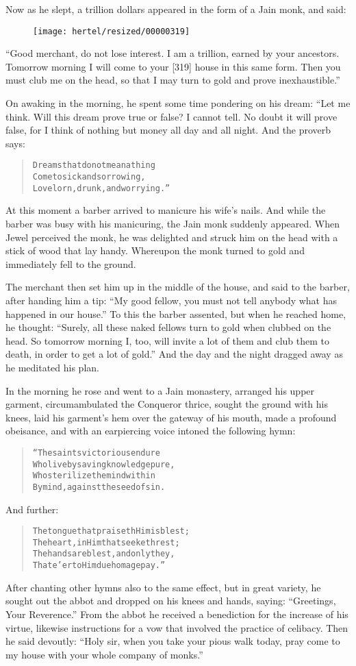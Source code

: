 \documentclass[article, twoside, 10pt]{memoir}
\renewenvironment{verbatim}{%
\begin{quote}%
\vskip -10pt%
\begin{alltt}\normalfont\small}{\end{alltt}%
\end{quote}%
\vskip -10pt
} %
\begin{document}
Now as he slept, a trillion dollars appeared in the form of a Jain
monk, and said:
\begin{figure}[p]\texttt{[image: hertel/resized/00000319]}\end{figure}``Good merchant, do not lose interest. I am a trillion, earned by your ancestors. Tomorrow morning I will come to your [319] house in this same form. Then you must club me on the head, so that I may turn to gold and prove inexhaustible.''

On awaking in the morning, he spent some time pondering on his
dream: “Let me think. Will this dream prove true or false? I cannot
tell. No doubt it will prove false, for I think of nothing but
money all day and all night. And the proverb says:

\begin{verbatim}
Dreams that do not mean a thing
Come to sick and sorrowing,
Lovelorn, drunk, and worrying.”
\end{verbatim}
At this moment a barber arrived to manicure his wife's nails. And
while the barber was busy with his manicuring, the Jain monk
suddenly appeared. When Jewel perceived the monk, he was delighted
and struck him on the head with a stick of wood that lay handy.
Whereupon the monk turned to gold and immediately fell to the
ground.

The merchant then set him up in the middle of the house, and said
to the barber, after handing him a tip:
``My good fellow, you must not tell anybody what has happened in our house.''
To this the barber assented, but when he reached home, he thought:
``Surely, all these naked fellows turn to gold when clubbed on the head. So tomorrow morning I, too, will invite a lot of them and club them to death, in order to get a lot of gold.''
And the day and the night dragged away as he meditated his plan.

In the morning he rose and went to a Jain monastery, arranged his
upper garment, circumambulated the Conqueror thrice, sought the
ground with his knees, laid his garment's hem over the gateway of
his mouth, made a profound obeisance, and with an earpiercing voice
intoned the following hymn:

\begin{verbatim}
“The saints victorious endure
Who live by saving knowledge pure,
Who sterilize the mind within
By mind, against the seed of sin.
\end{verbatim}
And further:

\begin{verbatim}
The tongue that praiseth Him is blest;
The heart, in Him that seeketh rest;
The hands are blest, and only they,
That e'er to Him due homage pay.”
\end{verbatim}
After chanting other hymns also to the same effect, but in great
variety, he sought out the abbot and dropped on his knees and
hands, saying: ``Greetings, Your Reverence.'' From the abbot he
received a benediction for the increase of his virtue, likewise
instructions for a vow that involved the practice of celibacy. Then
he said devoutly:
``Holy sir, when you take your pious walk today, pray come to my house with your whole company of monks.''
\end{document}
